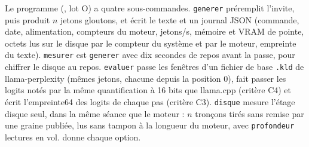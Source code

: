 Le programme (, lot O) a quatre sous-commandes. \texttt{generer} préremplit l'invite, puis produit $n$ jetons gloutons, et écrit le texte et un journal JSON (commande, date, alimentation, compteurs du moteur, jetons/s, mémoire et VRAM de pointe, octets lus sur le disque par le compteur du système et par le moteur, empreinte du texte). \texttt{mesurer} est \texttt{generer} avec dix secondes de repos avant la passe, pour chiffrer le disque au repos. \texttt{evaluer} passe les fenêtres d'un fichier de base \texttt{.kld} de llama-perplexity (mêmes jetons, chacune depuis la position 0), fait passer les logits notés par la même quantification à 16 bits que llama.cpp (critère C4) et écrit l'empreinte64 des logits de chaque pas (critère C3). \texttt{disque} mesure l'étage disque seul, dans la même séance que le moteur : $n$ tronçons tirés sans remise par une graine publiée, lus sans tampon à la longueur du moteur, avec \texttt{profondeur} lectures en vol.  donne chaque option.

